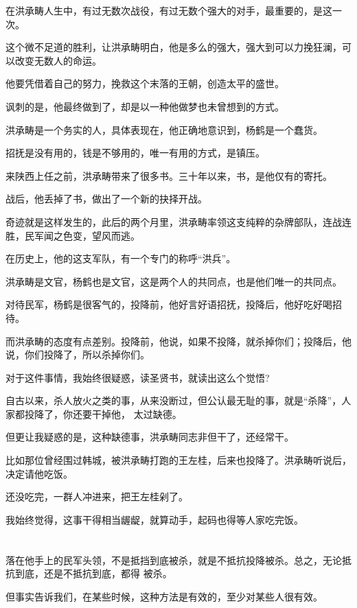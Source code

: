\documentclass[11pt,a4paper,onecolumn]{article}
\begin{document}
在洪承畴人生中，有过无数次战役，有过无数个强大的对手，最重要的，是这一次。

这个微不足道的胜利，让洪承畴明白，他是多么的强大，强大到可以力挽狂澜，可以改变无数人的命运。

他要凭借着自己的努力，挽救这个末落的王朝，创造太平的盛世。

讽刺的是，他最终做到了，却是以一种他做梦也未曾想到的方式。

洪承畴是一个务实的人，具体表现在，他正确地意识到，杨鹤是一个蠢货。

招抚是没有用的，钱是不够用的，唯一有用的方式，是镇压。

来陕西上任之前，洪承畴带来了很多书。三十年以来，书，是他仅有的寄托。

战后，他丢掉了书，做出了一个新的抉择\myrule 开战。

奇迹就是这样发生的，此后的两个月里，洪承畴率领这支纯粹的杂牌部队，连战连胜，民军闻之色变，望风而逃。

在历史上，他的这支军队，有一个专门的称呼\myrule ``洪兵''。

洪承畴是文官，杨鹤也是文官，这是两个人的共同点，也是他们唯一的共同点。

对待民军，杨鹤是很客气的，投降前，他好言好语招抚，投降后，他好吃好喝招待。

而洪承畴的态度有点差别。投降前，他说，如果不投降，就杀掉你们；投降后，他说，你们投降了，所以杀掉你们。

对于这件事情，我始终很疑惑，读圣贤书，就读出这么个觉悟?

自古以来，杀人放火之类的事，从来没断过，但公认最无耻的事，就是``杀降''，人家都投降了，你还要干掉他，
太过缺德。

但更让我疑惑的是，这种缺德事，洪承畴同志非但干了，还经常干。

比如那位曾经围过韩城，被洪承畴打跑的王左桂，后来也投降了。洪承畴听说后，决定请他吃饭。

还没吃完，一群人冲进来，把王左桂剁了。

我始终觉得，这事干得相当龌龊，就算动手，起码也得等人家吃完饭。

\section[\thesection]{}

落在他手上的民军头领，不是抵挡到底被杀，就是不抵抗投降被杀。总之，无论抵抗到底，还是不抵抗到底，都得
被杀。

但事实告诉我们，在某些时候，这种方法是有效的，至少对某些人很有效。
\end{document}
